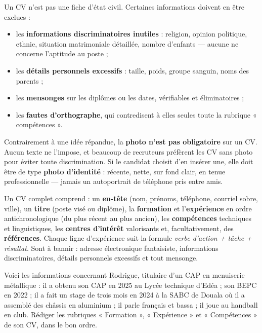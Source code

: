 \documentclass[11pt]{article}
\newcounter{popsec}
\newcounter{popsub}
\newcommand{\courssub}[1]{%
  \stepcounter{popsub}%
  \par\vspace{9pt}\noindent{\popxbold\fontsize{11.5}{13}\selectfont\color{popink}{\color{poporange}\thepopsec.\thepopsub}\hspace{6pt}#1}\par\nopagebreak\vspace{4pt}
}
\begin{document}
\courssub{Ce qu'il faut éviter}

Un CV n'est pas une fiche d'état civil. Certaines informations doivent en être exclues :
\begin{itemize}
\item les \textbf{informations discriminatoires inutiles} : religion, opinion politique, ethnie, situation matrimoniale détaillée, nombre d'enfants — aucune ne concerne l'aptitude au poste ;
\item les \textbf{détails personnels excessifs} : taille, poids, groupe sanguin, noms des parents ;
\item les \textbf{mensonges} sur les diplômes ou les dates, vérifiables et éliminatoires ;
\item les \textbf{fautes d'orthographe}, qui contredisent à elles seules toute la rubrique « compétences ».
\end{itemize}

\begin{savaistu}
Contrairement à une idée répandue, la \textbf{photo n'est pas obligatoire} sur un CV. Aucun texte ne l'impose, et beaucoup de recruteurs préfèrent les CV sans photo pour éviter toute discrimination. Si le candidat choisit d'en insérer une, elle doit être de type \textbf{photo d'identité} : récente, nette, sur fond clair, en tenue professionnelle — jamais un autoportrait de téléphone pris entre amis.
\end{savaistu}

\begin{aretenir}
Un CV complet comprend : un \textbf{en-tête} (nom, prénoms, téléphone, courriel sobre, ville), un \textbf{titre} (poste visé ou diplôme), la \textbf{formation} et l'\textbf{expérience} en ordre antichronologique (du plus récent au plus ancien), les \textbf{compétences} techniques et linguistiques, les \textbf{centres d'intérêt} valorisants et, facultativement, des \textbf{références}. Chaque ligne d'expérience suit la formule \emph{verbe d'action + tâche + résultat}. Sont à bannir : adresse électronique fantaisiste, informations discriminatoires, détails personnels excessifs et tout mensonge.
\end{aretenir}

\begin{exercice}
Voici les informations concernant Rodrigue, titulaire d'un CAP en menuiserie métallique : il a obtenu son CAP en 2025 au Lycée technique d'Edéa ; son BEPC en 2022 ; il a fait un stage de trois mois en 2024 à la SABC de Douala où il a assemblé des châssis en aluminium ; il parle français et bassa ; il joue au handball en club. Rédiger les rubriques « Formation », « Expérience » et « Compétences » de son CV, dans le bon ordre.
\end{exercice}
\end{document}

